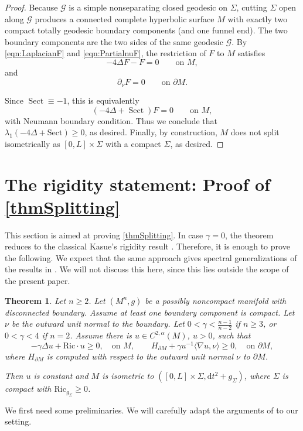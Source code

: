 \documentclass[12pt,a4paper,reqno]{amsart}
\newtheorem{theorem}{Theorem}
\theoremstyle{definition}
\renewcommand{\geq}{\geqslant}
\begin{document}
{\begin{proof}
Because $\mathcal G$ is a simple nonseparating closed geodesic on $\Sigma$, cutting $\Sigma$ open along $\mathcal G$
produces a connected complete hyperbolic surface $M$ with exactly two compact totally
geodesic boundary components (and one funnel end). The two boundary components
are the two sides of the same geodesic $\mathcal G$. By \eqref{eqn:LaplacianF} and \eqref{eqn:PartialnuF}, the restriction of $F$ to $M$ satisfies
\[
-4\Delta F-F=0
\qquad
\text{on } M,
\]
and
\[
\partial_\nu F=0
\qquad
\text{on } \partial M.
\]

Since $\operatorname{Sect}\equiv -1$, this is equivalently
\[
(-4\Delta+\operatorname{Sect})F=0
\qquad
\text{on } M,
\]
with Neumann boundary condition. Thus we conclude that $\lambda_1(-4\Delta+\mathrm{Sect})\geq 0$, as desired. Finally, by construction, $M$ does not split isometrically as $[0,L]\times\Sigma$ with a compact $\Sigma$, as desired.
\end{proof}
\section{The rigidity statement: Proof of \cref{thmSplitting}}\label{sec:Rigid}

    This section is aimed at proving \cref{thmSplitting}. In case $\gamma=0$, the theorem reduces to the classical Kasue's rigidity result \cite[Theorem B(1)]{Kasue83}. Therefore, it is enough to prove the following. We expect that the same approach gives spectral generalizations of the results in \cite{CrokeKleiner}. We will not discuss this here, since this lies outside the scope of the present paper.
    \begin{theorem}\label{ThmRigid}
Let $n\geq 2$. Let $(M^n,g)$ be a possibly noncompact manifold with disconnected boundary. Assume at least one boundary component is compact. Let $\nu$ be the outward unit normal to the boundary. Let $0<\gamma<\frac{n-1}{n-2}$ if $n\geq 3$, or $0< \gamma<4$ if $n=2$. Assume there is $u\in C^{2,\alpha}(M)$, $u>0$, such that 
        \[
        -\gamma\Delta u+\mathrm{Ric}\cdot u \geq 0, \quad \text{on $M$}, \qquad H_{\partial M}+\gamma u^{-1}\langle \nabla u,\nu\rangle\geq  0, \quad \text{on $\partial M$},
        \]
        where $H_{\partial M}$ is computed with respect to the outward unit normal $\nu$ to $\partial M$.
        
        Then $u$ is constant and $M$ is isometric to $([0,L]\times \Sigma,\mathrm{d}t^2+g_\Sigma)$, where $\Sigma$ is compact with $\mathrm{Ric}_{g_\Sigma}\geq 0$.
    \end{theorem}
We first need some preliminaries. We will carefully adapt the arguments of \cite{HongWang} to our setting.

}
\end{document}
